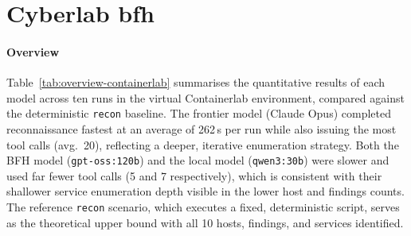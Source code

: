 \section{Cyberlab bfh}\label{sec:eval-cyberlab}

\paragraph{Overview}

\begin{table}[H]
    \caption{Nonlinear Model Results}
    \centering

    \label{tab:overview-cyberlab}
\end{table}

Table~\ref{tab:overview-containerlab} summarises the quantitative results of each model across ten runs
in the virtual Containerlab environment, compared against the deterministic \texttt{recon} baseline.
The frontier model (Claude Opus) completed reconnaissance fastest at an average of 262\,s per run
while also issuing the most tool calls (avg.\ 20), reflecting a deeper, iterative enumeration strategy.
Both the BFH model (\texttt{gpt-oss:120b}) and the local model (\texttt{qwen3:30b}) were slower
and used far fewer tool calls (5 and 7 respectively), which is consistent with their shallower
service enumeration depth visible in the lower host and findings counts.
The reference \texttt{recon} scenario, which executes a fixed, deterministic script, serves as
the theoretical upper bound with all 10 hosts, findings, and services identified.


